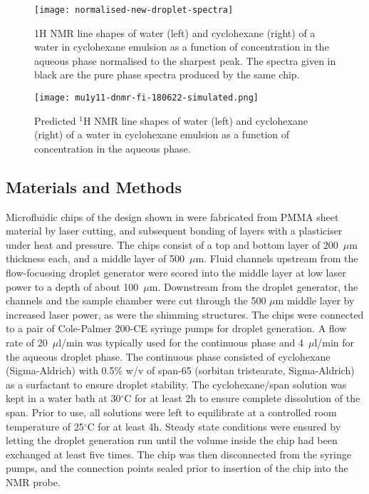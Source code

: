\begin{figure}
  \begin{center}
    \texttt{[image: normalised-new-droplet-spectra]}
  \end{center}
  \caption{1H NMR line shapes of water (left) and cyclohexane (right) of a
  water in cyclohexane emulsion as a function of  concentration
  in the aqueous phase normalised to the sharpest peak. The spectra given in black are the pure phase spectra produced by the same chip.
  }
  \label{fig:droplet-spectra}
\end{figure}


\begin{figure}
  \begin{center}
    \texttt{[image: mu1y11-dnmr-fi-180622-simulated.png]}
  \end{center}
  \caption{Predicted $^1$H NMR line shapes of water (left) and cyclohexane (right) of a
  water in cyclohexane emulsion as a function of  concentration
  in the aqueous phase.
  }
  \label{fig:predicted-spectra}
\end{figure}




\subsection*{Materials and Methods}
Microfluidic chips of the design shown in 
were fabricated from PMMA sheet material by
laser cutting, and subsequent bonding of layers with a plasticiser
under heat and pressure.\cite{Yilmaz:2016fx} The chips consist of a
top and bottom layer of 200~$\mu$m thickness each, and a middle layer of
500~$\mu$m. Fluid channels upstream from the flow-focussing droplet
generator were scored into the middle layer at low laser power to a depth
of about 100~$\mu$m. Downstream from the droplet generator, the channels and
the sample chamber were cut through the 500 $\mu$m middle layer by increased
laser power, as were the shimming structures. The chips were connected to
a pair of Cole-Palmer 200-CE syringe pumps for droplet generation.
A flow rate of 20~$\mu$l/min was typically used for the continuous
phase and 4~$\mu$l/min for the aqueous droplet phase.
The continuous phase consisted of cyclohexane (Sigma-Aldrich)
with 0.5\% w/v of span-65 (sorbitan
tristearate, Sigma-Aldrich) as a surfactant to ensure droplet stability.
The cyclohexane/span solution was kept in a water bath at 30$^\circ$C
for at least 2h to ensure complete dissolution of the span.
Prior to use, all solutions were left to equilibrate at a controlled room temperature
of 25$^\circ$C for at least 4h.
Steady state conditions were ensured by letting the droplet generation run until
the volume inside the chip had been exchanged at least five times. The
chip was then disconnected from the syringe pumps, and the connection
points sealed prior to insertion of the chip into the NMR probe.

